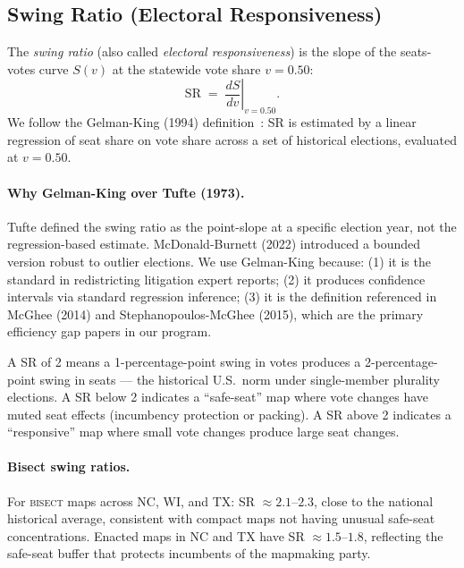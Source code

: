 \subsection{Swing Ratio (Electoral Responsiveness)}
\label{ssec:swing-ratio}

\begin{definition}
\label{def:swing-ratio}
The \emph{swing ratio} (also called \emph{electoral responsiveness}) is the slope
of the seats-votes curve $S(v)$ at the statewide vote share $v = 0.50$:
\[
  \mathrm{SR} \;=\; \left.\frac{dS}{dv}\right|_{v=0.50}.
\]
We follow the Gelman-King (1994) definition~\citep{gelman1994}: SR is estimated
by a linear regression of seat share on vote share across a set of historical
elections, evaluated at $v = 0.50$.
\end{definition}

\paragraph{Why Gelman-King over Tufte (1973).}
Tufte defined the swing ratio as the point-slope at a specific election year, not
the regression-based estimate. McDonald-Burnett (2022) introduced a bounded version
robust to outlier elections. We use Gelman-King because: (1) it is the standard
in redistricting litigation expert reports; (2) it produces confidence intervals
via standard regression inference; (3) it is the definition referenced in McGhee
(2014) and Stephanopoulos-McGhee (2015), which are the primary efficiency gap
papers in our program.

A SR of 2 means a 1-percentage-point swing in votes produces a 2-percentage-point
swing in seats — the historical U.S.\ norm under single-member plurality elections.
A SR below 2 indicates a ``safe-seat'' map where vote changes have muted seat effects
(incumbency protection or packing). A SR above 2 indicates a ``responsive'' map where
small vote changes produce large seat changes.

\paragraph{Bisect swing ratios.}
For \textsc{bisect} maps across NC, WI, and TX: SR $\approx 2.1$--$2.3$, close to
the national historical average, consistent with compact maps not having unusual
safe-seat concentrations. Enacted maps in NC and TX have SR $\approx 1.5$--$1.8$,
reflecting the safe-seat buffer that protects incumbents of the mapmaking party.
